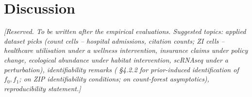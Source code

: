 \documentclass[11pt]{article}
\theoremstyle{plain}
\theoremstyle{definition}
\theoremstyle{remark}
\newcommand{\fzeroSym}{f_{0}}
\newcommand{\foneSym}{f_{1}}
\begin{document}
\section{Discussion}\label{sec:discussion}
\noindent\emph{[Reserved.  To be written after the empirical
evaluations.  Suggested topics: applied dataset picks (count cells --
hospital admissions, citation counts; ZI cells -- healthcare
utilisation under a wellness intervention, insurance claims under
policy change, ecological abundance under habitat intervention,
scRNAseq under a perturbation), identifiability remarks
(\citealt{murray2021loglinear} \S4.2.2 for prior-induced
identification of $\fzeroSym, \foneSym$;
\citealt{li2012zipidentifiability} on ZIP identifiability conditions;
\citealt{wager2018estimation} on count-forest asymptotics),
reproducibility statement.]}



\end{document}
